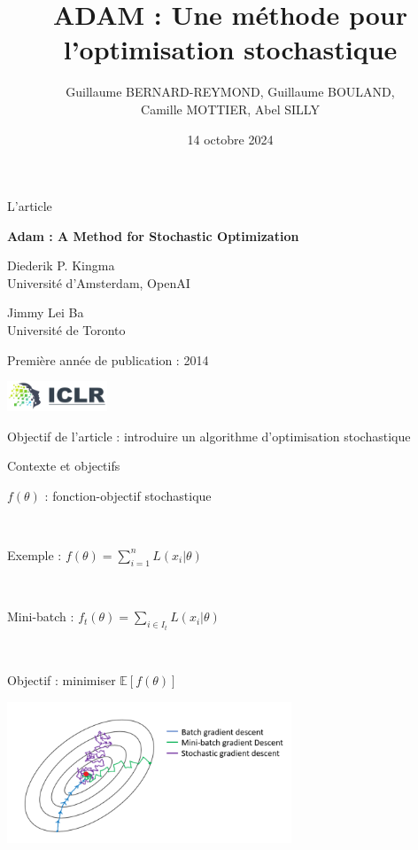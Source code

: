 \documentclass[11pt,aspectratio=169,xcolor=dvipsnames, french]{beamer}
\title{ADAM : Une méthode pour l'optimisation stochastique}
\author{Guillaume BERNARD-REYMOND, Guillaume BOULAND,\\ Camille MOTTIER, Abel SILLY}
\date{14 octobre 2024}
\begin{document}
\frame{\titlepage}

\begin{frame}{L'article}
\begin{center}
 \textbf{Adam : A Method for Stochastic Optimization}

\begin{multicols}{2}

 {\small Diederik P. Kingma}\\
 {\footnotesize Université d'Amsterdam, OpenAI}
 
 \columnbreak
 
 {\small Jimmy Lei Ba}\\
 {\footnotesize Université de Toronto}
\end{multicols}

Première année de publication : 2014

\includegraphics[width=3cm]{ICLR_Logo.png}

Objectif de l'article : introduire un algorithme d'optimisation stochastique
\end{center}

\end{frame}

\begin{frame}{Contexte et objectifs}
	\begin{minipage}[c]{.4\linewidth}
$f(\theta)$ : fonction-objectif stochastique 

\

Exemple : $f(\theta)=\displaystyle\sum_{i=1}^{n}L(x_i|\theta)$ 

\

Mini-batch : $f_t(\theta)=\displaystyle \sum_{i\in I_t}L(x_i|\theta)$

\

Objectif : minimiser $\mathbb E[f(\theta)]$
	\end{minipage} \hfill
	\begin{minipage}[c]{.55\linewidth}
	\includegraphics[width=8.5cm]{batch.png}

	\end{minipage}




\end{frame}
\end{document}
